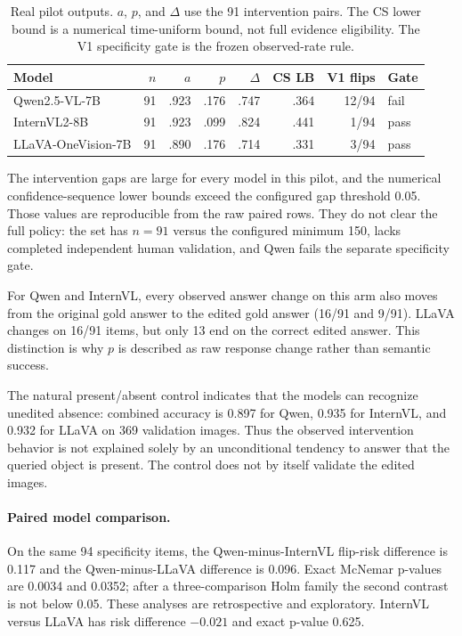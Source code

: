 \documentclass[10pt]{article}
\begin{document}
\begin{table}[t]
\centering
\caption{Real pilot outputs. $a$, $p$, and $\Delta$ use the 91 intervention pairs. The
CS lower bound is a numerical time-uniform bound, not full evidence eligibility. The V1
specificity gate is the frozen observed-rate rule.}
\small
\begin{tabular}{lrrrrrrl}
\toprule
Model & $n$ & $a$ & $p$ & $\Delta$ & CS LB & V1 flips & Gate \\
\midrule
Qwen2.5-VL-7B & 91 & .923 & .176 & .747 & .364 & 12/94 & fail \\
InternVL2-8B & 91 & .923 & .099 & .824 & .441 & 1/94 & pass \\
LLaVA-OneVision-7B & 91 & .890 & .176 & .714 & .331 & 3/94 & pass \\
\bottomrule
\end{tabular}
\end{table}

The intervention gaps are large for every model in this pilot, and the numerical
confidence-sequence lower bounds exceed the configured gap threshold 0.05. Those values
are reproducible from the raw paired rows. They do not clear the full policy: the set has
$n=91$ versus the configured minimum 150, lacks completed independent human validation,
and Qwen fails the separate specificity gate.

For Qwen and InternVL, every observed answer change on this arm also moves from the
original gold answer to the edited gold answer (16/91 and 9/91). LLaVA changes on 16/91
items, but only 13 end on the correct edited answer. This distinction is why $p$ is
described as raw response change rather than semantic success.

The natural present/absent control indicates that the models can recognize unedited
absence: combined accuracy is 0.897 for Qwen, 0.935 for InternVL, and 0.932 for LLaVA on
369 validation images. Thus the observed intervention behavior is not explained solely
by an unconditional tendency to answer that the queried object is present. The control
does not by itself validate the edited images.

\paragraph{Paired model comparison.}
On the same 94 specificity items, the Qwen-minus-InternVL flip-risk difference is 0.117
and the Qwen-minus-LLaVA difference is 0.096. Exact McNemar p-values are 0.0034 and
0.0352; after a three-comparison Holm family the second contrast is not below 0.05.
These analyses are retrospective and exploratory. InternVL versus LLaVA has risk
difference $-0.021$ and exact p-value 0.625.
\end{document}

